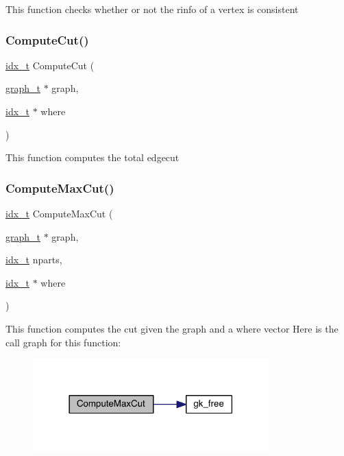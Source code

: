 This function checks whether or not the rinfo of a vertex is consistent \mbox{\label{a00882_a99abc93df5d5bca5819ed55a767c4e0e}} 
\subsubsection{\texorpdfstring{Compute\+Cut()}{ComputeCut()}}
{\footnotesize\ttfamily \hyperlink{a00876_aaa5262be3e700770163401acb0150f52}{idx\+\_\+t} Compute\+Cut (\begin{DoxyParamCaption}\item[{\hyperlink{a00734}{graph\+\_\+t} $\ast$}]{graph,  }\item[{\hyperlink{a00876_aaa5262be3e700770163401acb0150f52}{idx\+\_\+t} $\ast$}]{where }\end{DoxyParamCaption})}

This function computes the total edgecut \mbox{\label{a00882_a2c579207b8d0c26ec7e5bebbdceaa73d}} 
\subsubsection{\texorpdfstring{Compute\+Max\+Cut()}{ComputeMaxCut()}}
{\footnotesize\ttfamily \hyperlink{a00876_aaa5262be3e700770163401acb0150f52}{idx\+\_\+t} Compute\+Max\+Cut (\begin{DoxyParamCaption}\item[{\hyperlink{a00734}{graph\+\_\+t} $\ast$}]{graph,  }\item[{\hyperlink{a00876_aaa5262be3e700770163401acb0150f52}{idx\+\_\+t}}]{nparts,  }\item[{\hyperlink{a00876_aaa5262be3e700770163401acb0150f52}{idx\+\_\+t} $\ast$}]{where }\end{DoxyParamCaption})}

This function computes the cut given the graph and a where vector Here is the call graph for this function\+:\nopagebreak
\begin{figure}[H]
\begin{center}
\leavevmode
\includegraphics[width=258pt]{a00882_a2c579207b8d0c26ec7e5bebbdceaa73d_cgraph}
\end{center}
\end{figure}
\mbox{\label{a00882_aedd132a5a97a0887c9ce0513ad903a7d}} 
